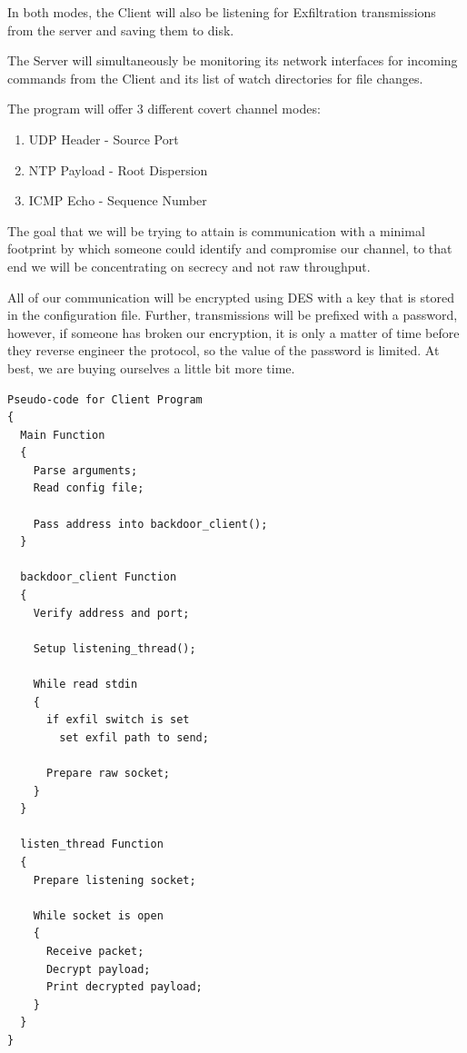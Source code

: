 \documentclass[titlepage]{article}
\begin{document}
In both modes, the Client will also be listening for Exfiltration transmissions from the server and saving them to disk.

The Server will simultaneously be monitoring its network interfaces for incoming commands from the Client and its list of
watch directories for file changes.

The program will offer 3 different covert channel modes:
\begin{enumerate}
  \item UDP Header - Source Port
  \item NTP Payload - Root Dispersion
  \item ICMP Echo - Sequence Number
\end{enumerate}

The goal that we will be trying to attain is communication with a minimal footprint by which someone could identify and compromise our channel, to
that end we will be concentrating on secrecy and not raw throughput.

All of our communication will be encrypted using DES with a key that is stored in the configuration file.  Further, transmissions will be prefixed with a password,
however, if someone has broken our encryption, it is only a matter of time before they reverse engineer the protocol, so the value of the password is limited.
At best, we are buying ourselves a little bit more time.

\clearpage

\begin{lstlisting}
Pseudo-code for Client Program
{
  Main Function
  {
    Parse arguments;
    Read config file;

    Pass address into backdoor_client();
  }

  backdoor_client Function
  {
    Verify address and port;

    Setup listening_thread();

    While read stdin
    {
      if exfil switch is set
        set exfil path to send;

      Prepare raw socket;
    }
  }

  listen_thread Function
  {
    Prepare listening socket;

    While socket is open
    {
      Receive packet;
      Decrypt payload;
      Print decrypted payload;
    }
  }
}
\end{lstlisting}

\clearpage
\end{document}
